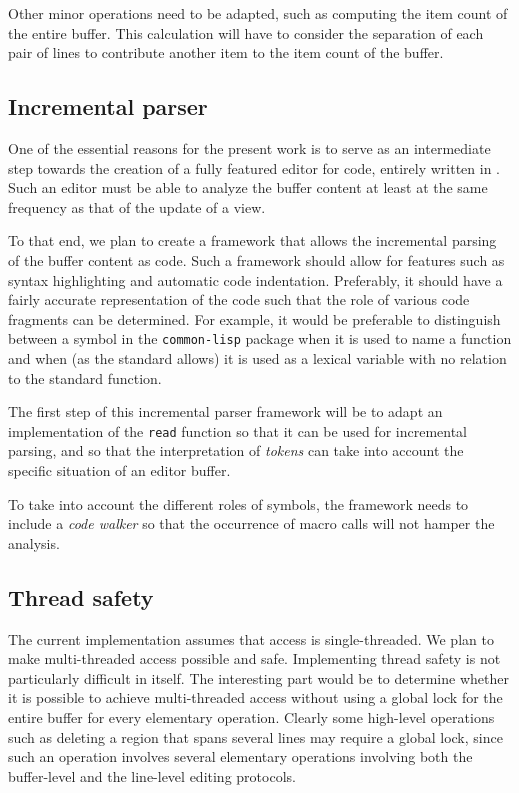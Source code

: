 Other minor operations need to be adapted, such as computing the item
count of the entire buffer.  This calculation will have to consider
the separation of each pair of lines to contribute another item to the
item count of the buffer.

\subsection{Incremental \commonlisp{} parser}

One of the essential reasons for the present work is to serve as an
intermediate step towards the creation of a fully featured editor for
\commonlisp{} code, entirely written in \commonlisp{}.  Such an editor
must be able to analyze the buffer content at least at the same
frequency as that of the update of a view.

To that end, we plan to create a framework that allows the incremental
parsing of the buffer content as \commonlisp{} code.  Such a
framework should allow for features such as syntax highlighting and
automatic code indentation.  Preferably, it should have a fairly
accurate representation of the code such that the role of various code
fragments can be determined.  For example, it would be preferable to
distinguish between a symbol in the \texttt{common-lisp} package when
it is used to name a \commonlisp{} function and when (as the
\commonlisp{} standard allows) it is used as a lexical variable with
no relation to the standard function.

The first step of this incremental parser framework will be to adapt
an implementation of the \commonlisp{} \texttt{read} function so that
it can be used for incremental parsing, and so that the interpretation
of \emph{tokens} can take into account the specific situation of an
editor buffer.

To take into account the different roles of symbols, the framework
needs to include a \emph{code walker} so that the occurrence of macro
calls will not hamper the analysis.

\subsection{Thread safety}

The current implementation assumes that access is single-threaded.  We
plan to make multi-threaded access possible and safe.  Implementing
thread safety is not particularly difficult in itself.  The
interesting part would be to determine whether it is possible to
achieve multi-threaded access without using a global lock for the
entire buffer for every elementary operation.  Clearly some high-level
operations such as deleting a region that spans several lines may
require a global lock, since such an operation involves several
elementary operations involving both the buffer-level and the
line-level editing protocols.

